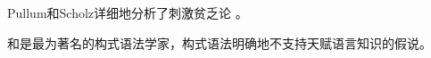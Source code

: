 Pullum和Scholz详细地分析了刺激贫乏论 \citep{PS2002a,SP2002b}。

\citet{Goldberg2006a}和\citet{Tomasello2003a}是最为著名的构式语法学家，构式语法明确地不支持天赋语言知识的假说。

